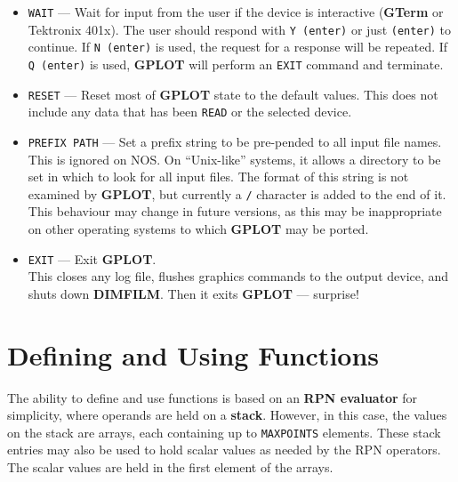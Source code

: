 \documentclass[a4paper,twoside,11pt]{article}
\newcommand{\textttc}[1]{\texttt{\textcolor{OurRed}{#1}}}
\begin{document}
\begin{itemize}
\item \textttc{WAIT} --- Wait for input from the user if the device is interactive (\textbf{GTerm} or Tektronix 401x).
  The user should respond with \texttt{Y (enter)} or just \texttt{(enter)} to continue.
  If \texttt{N (enter)} is used, the request
  for a response will be repeated. If \texttt{Q (enter)} is used, \textbf{GPLOT} will perform
  an \texttt{EXIT} command and terminate.
\item \textttc{RESET} --- Reset most of \textbf{GPLOT} state to the default values. This does not include any data that has been
  \texttt{READ} or the selected device.
\item \textttc{PREFIX PATH} --- Set a prefix string to be pre-pended to all input file names.\\
  This is ignored on NOS. On ``Unix-like'' systems, it allows a directory to be set in which to look for all
  input files. The format of this string is not examined by \textbf{GPLOT}, but currently a \texttt{/} character is added to the end
  of it. This behaviour may change in future versions, as this may be inappropriate on other operating systems to which
  \textbf{GPLOT} may be ported.
\item \textttc{EXIT} --- Exit \textbf{GPLOT}.\\
   This closes any log file, flushes graphics commands to the output device, and shuts down \textbf{DIMFILM}. 
   Then it exits \textbf{GPLOT} --- surprise!
\end{itemize}

\section{Defining and Using Functions}
The ability to define and use functions is based on an \textbf{RPN evaluator} for simplicity, where operands are held on a \textbf{stack}.
However, in this case, the values on the
stack are arrays, each containing up to \texttt{MAXPOINTS} elements. These stack entries may also be used to hold scalar values
as needed by the RPN operators. The scalar values are held in the first element of the arrays. 
\end{document}
